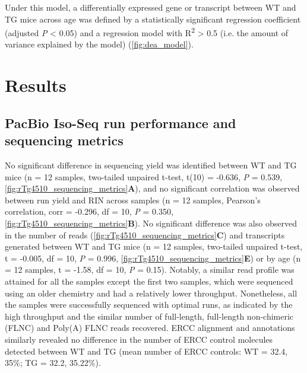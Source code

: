 Under this model, a differentially expressed gene or transcript between WT and TG mice across age was defined by a statistically significant regression coefficient (adjusted \textit{P} < 0.05) and a regression model with R\textsuperscript{2} > 0.5 (i.e. the amount of variance explained by the model) (\cref{fig:dea_model}). 


\clearpage 
\section{Results}
\subsection{PacBio Iso-Seq run performance and sequencing metrics}
No significant difference in sequencing yield was identified between WT and TG mice (n = 12 samples, two-tailed unpaired t-test, t(10) = -0.636, \textit{P} = 0.539, \cref{fig:rTg4510_sequencing_metrics}\textbf{A}), and no significant correlation was observed between run yield and RIN across samples (n = 12 samples, Pearson's correlation, corr = -0.296, df = 10, \textit{P} = 0.350, \cref{fig:rTg4510_sequencing_metrics}\textbf{B}). No significant difference was also observed in the number of reads (\cref{fig:rTg4510_sequencing_metrics}\textbf{C}) and transcripts generated between WT and TG mice (n = 12 samples, two-tailed unpaired t-test, t = -0.005, df = 10, \textit{P} = 0.996, \cref{fig:rTg4510_sequencing_metrics}\textbf{E}) or by age (n = 12 samples, t = -1.58, df = 10, \textit{P} = 0.15). Notably, a similar read profile was attained for all the samples except the first two samples, which were sequenced using an older chemistry and had a relatively lower throughput. Nonetheless, all the samples were successfully sequenced with optimal runs, as indicated by the high throughput and the similar number of full-length, full-length non-chimeric (FLNC) and Poly(A) FLNC reads recovered. ERCC alignment and annotations similarly revealed no difference in the number of ERCC control molecules detected between WT and TG (mean number of ERCC controls: WT = 32.4, 35\%; TG = 32.2, 35.22\%). 

